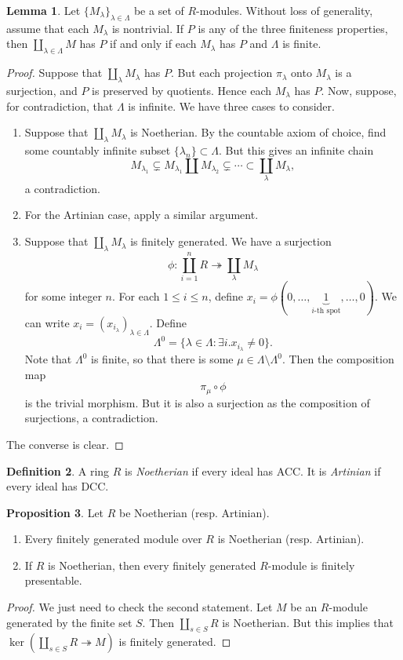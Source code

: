 \documentclass[10pt,letterpaper,cm]{nupset}
\theoremstyle{definition}
\newtheorem{definition}{Definition}[subsection]
\theoremstyle{theorem}
\newtheorem{lemma}[definition]{Lemma}
\newtheorem{prop}[definition]{Proposition}
\theoremstyle{remark}
\newcommand{\1}{\mathbf{1}}
\newcommand{\0}{\vec 0}
\begin{document}
\begin{lemma}
Let $\{M_{\lambda}\}_{\lambda\in \Lambda}$ be a set of $R$-modules. Without loss of generality, assume that each $M_{\lambda}$ is nontrivial. If $P$ is any of the three finiteness properties, then $\coprod_{\lambda \in \Lambda} M$ has $P$  if and only if each $M_{\lambda}$ has $P$ and $\Lambda$ is finite.
\end{lemma}
\begin{proof} 
Suppose that $\coprod_{\lambda} M_{\lambda}$ has $P$. But each projection $\pi_{\lambda}$ onto $M_{\lambda}$ is a surjection, and $P$ is preserved by quotients. Hence each $M_{\lambda}$ has $P$. Now, suppose, for contradiction, that $\Lambda$ is infinite. We have three cases to consider.
\begin{enumerate}
\item Suppose that $\coprod_{\lambda} M_{\lambda}$ is Noetherian. By the countable axiom of choice, find some countably infinite subset $\{\lambda_n\}\subset \Lambda.$ But this gives an infinite chain $$M_{\lambda_1} \subsetneq M_{\lambda_1} \coprod M_{\lambda_2} \subsetneq \cdots \subset \coprod_{\lambda} M_{\lambda},$$ a contradiction.
\item For the Artinian case, apply a similar argument.
\item Suppose that $\coprod_{\lambda} M_{\lambda}$ is finitely generated. We have a surjection $$\phi: \coprod_{i=1}^n R \twoheadrightarrow \coprod_{\lambda} M_{\lambda}$$ for some integer $n$. For each $1\leq i\leq n$, define $x_i = \phi(0, \ldots, \underbrace{1}_{i\text{-th spot}}, \ldots, 0).$ We can write $x_i = (x_{i_{\lambda}})_{\lambda \in \Lambda}$. Define $$\Lambda^0 = \{\lambda \in \Lambda : \exists i. x_{i_\lambda}\ne 0 \} .$$ Note that $\Lambda^0$ is finite, so that there is some $\mu \in \Lambda \setminus \Lambda^0$.  Then the composition map $$\pi_{\mu} \circ \phi$$ is the trivial morphism. But it is also a surjection as the composition of surjections, a contradiction. 
\end{enumerate}
The converse is clear.
\end{proof}

\begin{definition}
A ring $R$ is \textit{Noetherian} if every ideal has  ACC. It is \textit{Artinian} if every ideal has DCC.
\end{definition}


\begin{prop} Let $R$ be Noetherian (resp. Artinian).
\begin{enumerate}
\item Every finitely generated module over $R$ is Noetherian (resp. Artinian).
\item If $R$ is Noetherian, then every finitely generated $R$-module is finitely presentable. 
\end{enumerate}
\end{prop}
\begin{proof}
We just need to check the second statement. Let $M$ be an $R$-module generated by the finite set $S$. Then  $\coprod_{s\in S} R$  is Noetherian. But this implies that $\ker(\coprod_{s\in S} R \twoheadrightarrow M)$ is finitely generated.
\end{proof}
\end{document}
